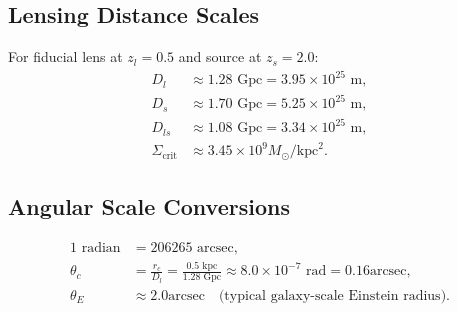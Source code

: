 \documentclass[11pt,a4paper]{article}
\newcommand{\Msun}{\ensuremath{M_\odot}}
\newcommand{\kpc}{\ensuremath{\mathrm{kpc}}}
\newcommand{\arcsec}{\ensuremath{\text{arcsec}}}
\theoremstyle{definition}
\theoremstyle{remark}
\begin{document}
\subsection{Lensing Distance Scales}

For fiducial lens at $z_l = 0.5$ and source at $z_s = 2.0$:
\begin{align}
D_l &\approx 1.28 \text{ Gpc} = 3.95 \times 10^{25} \text{ m}, \\
D_s &\approx 1.70 \text{ Gpc} = 5.25 \times 10^{25} \text{ m}, \\
D_{ls} &\approx 1.08 \text{ Gpc} = 3.34 \times 10^{25} \text{ m}, \\
\Sigma_{\mathrm{crit}} &\approx 3.45 \times 10^9 \Msun/\kpc^2.
\end{align}

\subsection{Angular Scale Conversions}

\begin{align}
1 \text{ radian} &= 206265 \text{ arcsec}, \\
\theta_c &= \frac{r_c}{D_l} = \frac{0.5 \text{ kpc}}{1.28 \text{ Gpc}} \approx 8.0 \times 10^{-7} \text{ rad} = 0.16\arcsec, \\
\theta_E &\approx 2.0\arcsec \quad \text{(typical galaxy-scale Einstein radius)}.
\end{align}

\end{document}
